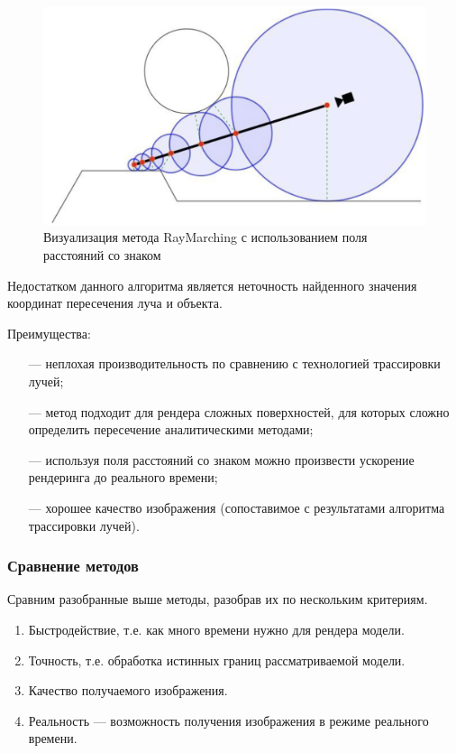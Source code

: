 \begin{figure}[h]
	\centering
	\captionsetup{justification=centering}
	\includegraphics[width=120mm]{img/raymarchingsdf.png}
	\caption{Визуализация метода RayMarching с использованием поля расстояний со знаком}
	\label{fig:raymarchingsdf}
\end{figure}

Недостатком данного алгоритма является неточность найденного значения координат пересечения луча и объекта.

Преимущества:
\begin{itemize}[leftmargin=1.6\parindent]
	\item[---] неплохая производительность по сравнению с технологией трассировки лучей;
	\item[---] метод подходит для рендера сложных поверхностей, для которых 
	сложно определить пересечение аналитическими методами;
	\item[---] используя поля расстояний со знаком можно произвести ускорение 
	рендеринга до реального времени;
	\item[---] хорошее качество изображения (сопоставимое с результатами алгоритма трассировки лучей).
\end{itemize}
\clearpage

\subsubsection{Сравнение методов}

Сравним разобранные выше методы, разобрав их по нескольким 
критериям.
\begin{enumerate}[leftmargin=1.6\parindent,label=\arabic*.]
	\item Быстродействие, т.е. как много времени нужно для рендера модели.
	\item Точность, т.е. обработка истинных границ рассматриваемой модели.
	\item Качество получаемого изображения.
	\item Реальность — возможность получения изображения в режиме 
	реального времени.
\end{enumerate}

